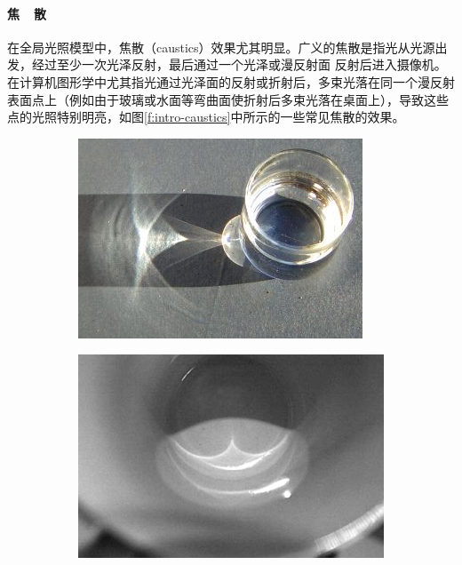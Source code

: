 \paragraph{焦~~散}
在全局光照模型中，焦散（caustics）效果尤其明显。广义的焦散是指光从光源出发，经过至少一次光泽反射，最后通过一个光泽或漫反射面 反射后进入摄像机。在计算机图形学中尤其指光通过光泽面的反射或折射后，多束光落在同一个漫反射表面点上（例如由于玻璃或水面等弯曲面使折射后多束光落在桌面上），导致这些点的光照特别明亮，如图\ref{f:intro-caustics}中所示的一些常见焦散的效果。

\begin{figure}
\begin{fullwidth}
	\begin{subfigure}[b]{0.26\thewidth}
		\includegraphics[width=1.\textwidth]{figures/intro/Caustics-1}
	\end{subfigure}
	\begin{subfigure}[b]{0.2758\thewidth}
		\includegraphics[width=1.\textwidth]{figures/intro/Caustics-2}

\end{subfigure}
\end{fullwidth}
\end{figure}
